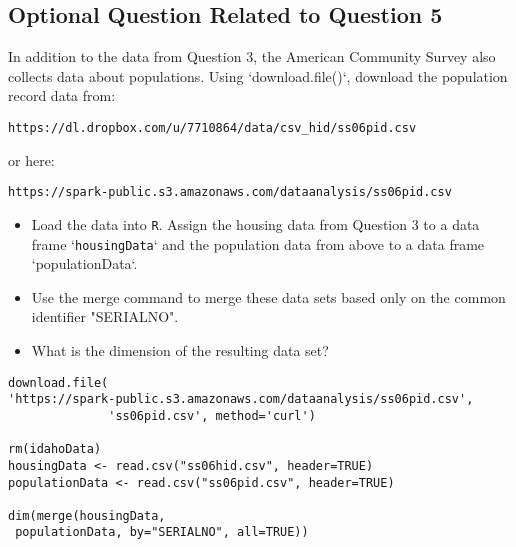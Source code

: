 \documentclass[]{article}
\begin{document}

\newpage
\subsection*{Optional Question Related to Question 5}

In addition to the data from Question 3, the American Community Survey also collects data about populations. 
Using `download.file()`, download the population record data from: 

\begin{verbatim}
https://dl.dropbox.com/u/7710864/data/csv_hid/ss06pid.csv 
\end{verbatim}
or here:
\begin{verbatim}
https://spark-public.s3.amazonaws.com/dataanalysis/ss06pid.csv
\end{verbatim}

\begin{itemize}
\item Load the data into \texttt{R}. Assign the housing data from Question 3 to a data frame `\texttt{housingData}` and the population data from above to a data frame `populationData`.

\item Use the merge command to merge these data sets based only on the common identifier "SERIALNO". 

\item What is the dimension of the resulting data set? 
\end{itemize}

\begin{framed} 
\begin{verbatim}
download.file(
'https://spark-public.s3.amazonaws.com/dataanalysis/ss06pid.csv',
              'ss06pid.csv', method='curl')

rm(idahoData)
housingData <- read.csv("ss06hid.csv", header=TRUE)
populationData <- read.csv("ss06pid.csv", header=TRUE)

dim(merge(housingData, 
 populationData, by="SERIALNO", all=TRUE))
\end{verbatim}
\end{framed} 

\end{document}
